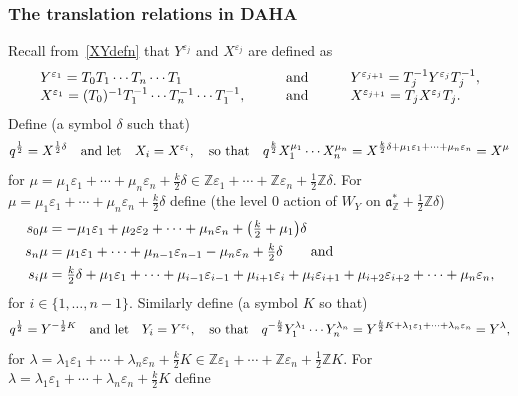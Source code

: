 \documentclass[11pt]{article}
\theoremstyle{plain}
\theoremstyle{definition}
\theoremstyle{remark}
\numberwithin{equation}{section}
\def\ZZ{\mathbb{Z}}
\def\fa{\mathfrak{a}}
\newcounter{r}
\newcounter{s}
\begin{document}
\subsubsection{The translation relations in DAHA}

Recall from~\eqref{XYdefn} that $Y^{\varepsilon_j}$ and $X^{\varepsilon_j}$ are defined as
\begin{equation*}
\begin{array}{lcl}
Y^{\varepsilon_1} = T_0T_1\cdots T_n\cdots T_1
&\qquad
\hbox{and}\qquad 
&Y^{\varepsilon_{j+1}} = T_j^{-1}Y^{\varepsilon_j}T_j^{-1},
\\
X^{\varepsilon_1} = (T_0)^{-1}T_1^{-1}\cdots T_n^{-1}\cdots T_1^{-1},
&\quad\hbox{and}\quad
&X^{\varepsilon_{j+1}}
= T_j X^{\varepsilon_j}T_j.
\end{array}
\end{equation*}
Define (a symbol $\delta$ such that)
$$q^{\frac12} = X^{\frac12\delta} \quad\hbox{and let}\quad
X_i = X^{\varepsilon_i},
\quad\hbox{so that}\quad
q^{\frac{k}{2}} X_1^{\mu_1}\cdots X_n^{\mu_n}
=X^{\frac{k}{2}\delta+\mu_1\varepsilon_1+\cdots+\mu_n\varepsilon_n}=X^\mu
$$
for $\mu = \mu_1\varepsilon_1+\cdots+\mu_n\varepsilon_n+\frac{k}{2}\delta
\in\ZZ\varepsilon_1+\cdots+\ZZ\varepsilon_n + \frac{1}{2}\ZZ \delta$.  
For $\mu = \mu_1\varepsilon_1+\cdots+\mu_n\varepsilon_n+\frac{k}{2}\delta$ define
(the level 0 action of $W_Y$ on $\fa^*_\ZZ+\frac12\ZZ\delta$)
\begin{align*}
s_0\mu
&=  
-\mu_1\varepsilon_1+\mu_2\varepsilon_2+\cdots+\mu_n\varepsilon_n
+\big(\hbox{$\frac{k}{2}$}+\mu_1\big)\delta
\\
s_n\mu
&=  \mu_1\varepsilon_1+\cdots+\mu_{n-1}\varepsilon_{n-1}-\mu_n\varepsilon_n
+\hbox{$\frac{k}{2}$}\delta
\qquad\hbox{and}
\\
s_i\mu
&=  \hbox{$\frac{k}{2}$}\delta+\mu_1\varepsilon_1+\cdots
+\mu_{i-1}\varepsilon_{i-1}+\mu_{i+1}\varepsilon_i+\mu_i\varepsilon_{i+1}
+\mu_{i+2}\varepsilon_{i+2}+\cdots +\mu_n\varepsilon_n,
\end{align*}
for $i\in \{1, \ldots, n-1\}$.
Similarly define (a symbol $K$ so that)
$$q^{\frac12} = Y^{-\frac12 K} \quad\hbox{and let}\quad
Y_i = Y^{\varepsilon_i},
\quad\hbox{so that}\quad
q^{-\frac{k}{2}} Y_1^{\lambda_1}\cdots Y_n^{\lambda_n}
=Y^{\frac{k}{2}K+\lambda_1\varepsilon_1+\cdots+\lambda_n\varepsilon_n}=Y^{\lambda},
$$
for $\lambda 
= \lambda_1\varepsilon_1+\cdots+\lambda_n\varepsilon_n+\frac{k}{2}K
\in \ZZ\varepsilon_1+\cdots+\ZZ\varepsilon_n+\frac{1}{2}\ZZ K$.  
For $\lambda 
= \lambda_1\varepsilon_1 +\cdots + \lambda_n\varepsilon_n+\frac{k}{2}K$ define
\end{document}
